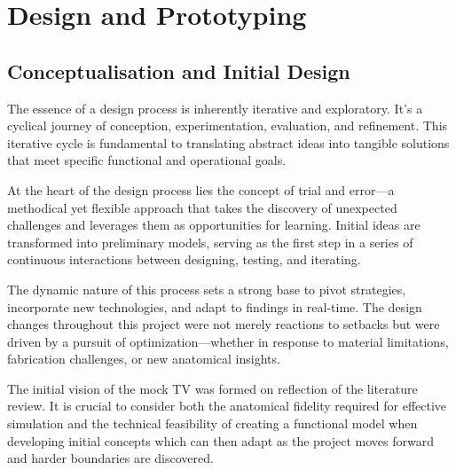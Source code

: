 \chapter{Design and Prototyping}\label{ch:DesProt}
\vspace{-2.5em}
{}\synopsisDesign
\mynewline
\section{Conceptualisation and Initial Design}
The essence of a design process is inherently iterative and exploratory. It's a cyclical journey of conception, experimentation, evaluation, and refinement. This iterative cycle is fundamental to translating abstract ideas into tangible solutions that meet specific functional and operational goals.

At the heart of the design process lies the concept of trial and error—a methodical yet flexible approach that takes the discovery of unexpected challenges and leverages them as opportunities for learning. Initial ideas are transformed into preliminary models, serving as the first step in a series of continuous interactions between designing, testing, and iterating.

The dynamic nature of this process sets a strong base to pivot strategies, incorporate new technologies, and adapt to findings in real-time. The design changes throughout this project were not merely reactions to setbacks but were driven by a pursuit of optimization—whether in response to material limitations, fabrication challenges, or new anatomical insights.


\mynewline
The initial vision of the mock \gls{TV} was formed on reflection of the literature review. It is crucial to consider both the anatomical fidelity required for effective simulation and the technical feasibility of creating a functional model when developing initial concepts which can then adapt as the project moves forward and harder boundaries are discovered.

